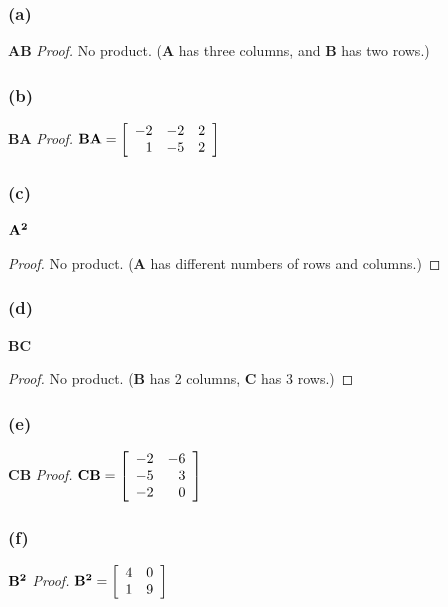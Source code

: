 \documentclass[14pt]{extarticle}
\begin{document}
\subsubsection{(a)}
{\bf AB}\hspace{3cm}
{\it Proof.}
No product. ({\bf A} has three columns, and {\bf B} has two rows.)

\subsubsection{(b)}
{\bf BA}\hspace{3cm}
{\it Proof.}
\({\bf BA} =
\left[
    \begin{array}{rrr}
        -2 & -2 & 2 \\
        1  & -5 & 2 \\
    \end{array}
    \right]
\)

\subsubsection{(c)}
\({\bf A^2}\)
\begin{proof}
    No product. ({\bf A} has different numbers of rows and columns.)
\end{proof}

\subsubsection{(d)}
{\bf BC}
\begin{proof}
    No product. ({\bf B} has 2 columns, {\bf C} has 3 rows.)
\end{proof}

\subsubsection{(e)}
{\bf CB}\hspace{3cm}
{\it Proof.}
\({\bf CB} =
\left[
    \begin{array}{rr}
        -2 & -6 \\
        -5 & 3  \\
        -2 & 0  \\
    \end{array}
    \right]
\)

\subsubsection{(f)}
\({\bf B^2}\)\hspace{3cm}
{\it Proof.}
\({\bf B^2} =
\left[
    \begin{array}{rr}
        4 & 0 \\
        1 & 9 \\
    \end{array}
    \right]
\)
\end{document}
